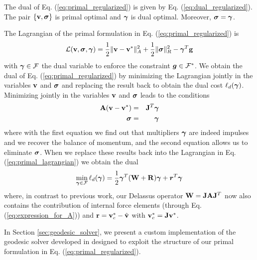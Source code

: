 \begin{theorem}	
The dual of Eq. (\ref{eq:primal_regularized}) is given by Eq.
(\ref{eq:dual_regularized}). The pair $\{{\mathbf{v}},{\bm\sigma}\}$ is primal optimal and
${\bm\gamma}$ is dual optimal. Moreover, ${\bm\sigma} = {\bm\gamma}$.
\label{th:primal_dual_equivalence}
\end{theorem}

\begin{IEEEproof}
The Lagrangian of the primal formulation in Eq. (\ref{eq:primal_regularized}) is
\begin{equation}
	\mathcal{L}(\mf{v},\bsigma,\vf{\gamma}) =
	\frac{1}{2}\Vert\mf{v}-\mf{v}^*\Vert_{A}^2 +
	\frac{1}{2} \Vert\bsigma\Vert_{R}^2 - \vf{\gamma}^T\mf{g}
	\label{eq:primal_lagrangian}
\end{equation}
with ${\bm{\gamma}}\in\mathcal{F}$ the dual variable to enforce the constraint
${\bm{g}}\in \mathcal{F}^*$. We obtain the dual of Eq.
(\ref{eq:primal_regularized}) by minimizing the Lagrangian jointly in the
variables ${\mathbf{v}}$ and ${\bm\sigma}$ and replacing the result back to obtain the
dual cost $\ell_d({\bm{\gamma}})$. Minimizing jointly in the variables ${\mathbf{v}}$
and ${\bm\sigma}$ leads to the conditions
\begin{eqnarray}
	{\mathbf{A}}({\mathbf{v}}-{\mathbf{v}}^*) &=& {\mathbf{J}}^T{\bm{\gamma}}\\
	{\bm{\sigma}} &=& {\bm{\gamma}}
\end{eqnarray}
where with the first equation we find out that multipliers ${\bm\gamma}$ are indeed
impulses and we recover the balance of momentum, and the second equation allows
us to eliminate ${\bm{\sigma}}$. When we replace these results back into the
Lagrangian in Eq. (\ref{eq:primal_lagrangian}) we obtain the dual
\begin{eqnarray}
	\min_{{\bm\gamma}\in \mathcal{F}} \ell_d({\bm\gamma}) =
	\frac{1}{2}{\bm\gamma}^T(\mathbf{W}+\mathbf{R}){\bm\gamma} + {\bm r}^T
	{\bm\gamma}
\end{eqnarray}
where, in contrast to previous work, our Delassus operator
${\mathbf{W}}={\mathbf{J}}{\mathbf{A}}{\mathbf{J}}^T$ now also contains the contribution of internal
force elements (through Eq. (\ref{eq:expression_for_A})) and
${\mathbf{r}}={\mathbf{v}}_c^*-\hat{{\mathbf{v}}}$ with ${\mathbf{v}}_c^*={\mathbf{J}}{\mathbf{v}}^*$.
\end{IEEEproof}

In Section \ref{sec:geodesic_solver}, we present a custom implementation of the
geodesic solver developed in \cite{bib:permenter2020} designed to exploit the
structure of our primal formulation in Eq. (\ref{eq:primal_regularized}).
